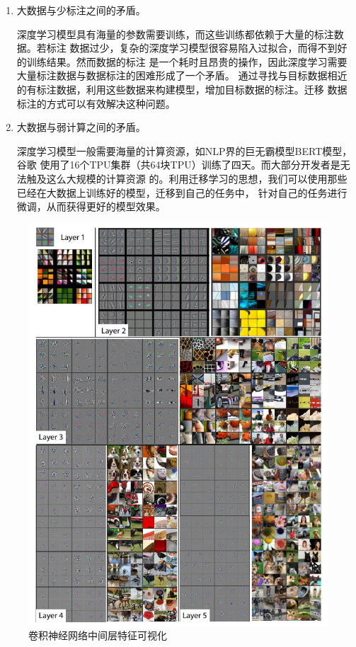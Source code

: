 \begin{enumerate}
    \item {大数据与少标注之间的矛盾。
    
    深度学习模型具有海量的参数需要训练，而这些训练都依赖于大量的标注数据。若标注
    数据过少，复杂的深度学习模型很容易陷入过拟合，而得不到好的训练结果。然而数据的标注
    是一个耗时且昂贵的操作，因此深度学习需要大量标注数据与数据标注的困难形成了一个矛盾。
    通过寻找与目标数据相近的有标注数据，利用这些数据来构建模型，增加目标数据的标注。迁移
    数据标注的方式可以有效解决这种问题。}
    \item {大数据与弱计算之间的矛盾。
    
    深度学习模型一般需要海量的计算资源，如NLP界的巨无霸模型BERT\cite{BERT}模型，谷歌
    使用了16个TPU集群（共64块TPU）训练了四天。而大部分开发者是无法触及这么大规模的计算资源
    的。利用迁移学习的思想，我们可以使用那些已经在大数据上训练好的模型，迁移到自己的任务中，
    针对自己的任务进行微调，从而获得更好的模型效果。}
\end{enumerate}

\begin{figure}[htbp]
    \centering
    \includegraphics{pic/chap3/imagenet_vis.jpg}
    \caption{卷积神经网络中间层特征可视化}
    \label{fig:ImageNet:vis}
\end{figure}
 
